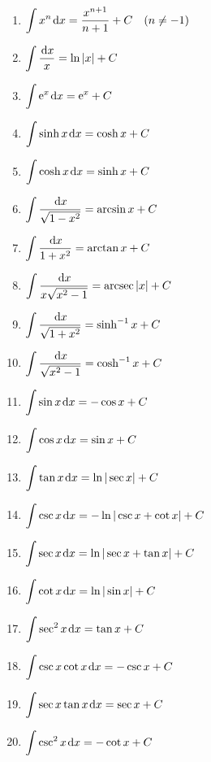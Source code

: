 \setcounter{chapter}{8}
\setcounter{section}{2}
\setcounter{theorem}{0}
\setcounter{equation}{0}


\begin{mdframed}
\begin{minipage}{0.5\linewidth}
\begin{enumerate}
\item $\displaystyle\int x^n\mkern 2mu \mathrm{d} x = \frac{x^{n+1}}{n+1}+C\quad (n\ne -1)$
\item $\displaystyle\int\frac{\mkern 2mu \mathrm{d} x}{x} = \ln|x| + C$
\item $\displaystyle\int\mathrm{e}^x\mkern 2mu \mathrm{d} x = \mathrm{e}^x + C$
\item $\displaystyle\int\sinh x\mkern 2mu \mathrm{d} x = \cosh x+C$
\item $\displaystyle\int\cosh x\mkern 2mu \mathrm{d} x=\sinh x + C$
\item $\displaystyle\int\frac{\mkern 2mu \mathrm{d} x}{\sqrt{1-x^2}} = \arcsin x + C$
\item $\displaystyle\int\frac{\mkern 2mu \mathrm{d} x}{1+x^2} = \arctan x + C$
\item $\displaystyle\int\frac{\mkern 2mu \mathrm{d} x}{x\sqrt{x^2-1}} = \operatorname{arcsec}|x|+C$
\item $\displaystyle\int\frac{\mkern 2mu \mathrm{d} x}{\sqrt{1+x^2}} = \sinh^{-1} x + C$
\item $\displaystyle\int\frac{\mkern 2mu \mathrm{d} x}{\sqrt{x^2-1}} = \cosh^{-1} x + C$
\end{enumerate}
\end{minipage}
\begin{minipage}{0.5\linewidth}
\begin{enumerate}
\setcounter{enumi}{10}
\item $\displaystyle\int\sin x\mkern 2mu \mathrm{d} x=-\cos x + C$
\item $\displaystyle\int\cos x\mkern 2mu \mathrm{d} x=\sin x +C$
\item $\displaystyle\int\tan x\mkern 2mu \mathrm{d} x=\ln|\sec x| + C$
\item $\displaystyle\int\csc x\mkern 2mu \mathrm{d} x=-\ln|\csc x+\cot x| + C$
\item $\displaystyle\int\sec x\mkern 2mu \mathrm{d} x=\ln|\sec x+\tan x|+C$
\item $\displaystyle\int\cot x\mkern 2mu \mathrm{d} x=\ln|\sin x| +C$
\item $\displaystyle\int\sec^2 x\mkern 2mu \mathrm{d} x = \tan x + C$
\item $\displaystyle\int\csc x\cot x\mkern 2mu \mathrm{d} x=-\csc x+C$
\item $\displaystyle\int\sec x\tan x\mkern 2mu \mathrm{d} x = \sec x+C$
\item $\displaystyle\int\csc^2 x\mkern 2mu \mathrm{d} x = -\cot x+C$
\end{enumerate}
\end{minipage}
\end{mdframed}

